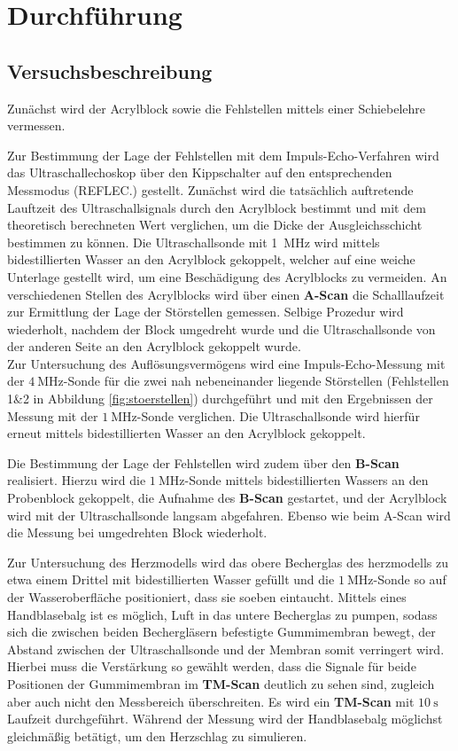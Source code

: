 \section{Durchführung}
\label{sec:Durchführung}



\subsection{Versuchsbeschreibung}
\label{sec:Versuchsbeschreibung}
Zunächst wird der Acrylblock sowie die Fehlstellen mittels einer Schiebelehre vermessen.

Zur Bestimmung der Lage der Fehlstellen mit dem Impuls-Echo-Verfahren wird das Ultraschallechoskop über den Kippschalter auf den entsprechenden Messmodus (REFLEC.) gestellt.
Zunächst wird die tatsächlich auftretende Lauftzeit des Ultraschallsignals durch den Acrylblock bestimmt und mit dem theoretisch berechneten Wert verglichen, um die Dicke der Ausgleichsschicht bestimmen zu können.
Die Ultraschallsonde mit \SI{1}{\mega\Hz} wird mittels bidestillierten Wasser an den Acrylblock gekoppelt, welcher auf eine weiche Unterlage gestellt wird, um eine Beschädigung des Acrylblocks zu vermeiden.
An verschiedenen Stellen des Acrylblocks wird über einen \textbf{A-Scan} die Schalllaufzeit zur Ermittlung der Lage der Störstellen gemessen. Selbige Prozedur wird wiederholt, nachdem der Block umgedreht wurde und die Ultraschallsonde von der anderen Seite an den Acrylblock gekoppelt wurde.
\\Zur Untersuchung des Auflösungsvermögens wird eine Impuls-Echo-Messung mit der $\SI{4}{\mega\Hz}$-Sonde für die zwei nah nebeneinander liegende Störstellen (Fehlstellen 1\&2 in Abbildung \ref{fig:stoerstellen}) durchgeführt und mit den Ergebnissen der Messung mit der $\SI{1}{\mega\Hz}$-Sonde verglichen.
Die Ultraschallsonde wird hierfür erneut mittels bidestillierten Wasser an den Acrylblock gekoppelt.

Die Bestimmung der Lage der Fehlstellen wird zudem über den \textbf{B-Scan} realisiert. Hierzu wird die $\SI{1}{\mega\Hz}$-Sonde mittels bidestillierten Wassers an den Probenblock gekoppelt, die Aufnahme des \textbf{B-Scan} gestartet, und der Acrylblock wird mit der Ultraschallsonde langsam abgefahren.
Ebenso wie beim A-Scan wird die Messung bei umgedrehten Block wiederholt.

Zur Untersuchung des Herzmodells wird das obere Becherglas des herzmodells zu etwa einem Drittel mit bidestillierten Wasser gefüllt und die $\SI{1}{\mega\Hz}$-Sonde so auf der Wasseroberfläche positioniert, dass sie soeben eintaucht. Mittels eines Handblasebalg ist es möglich, Luft in das untere Becherglas zu pumpen, sodass sich die zwischen beiden Bechergläsern befestigte Gummimembran bewegt, der Abstand zwischen der Ultraschallsonde und der Membran somit verringert wird. Hierbei muss die Verstärkung so gewählt werden, dass die Signale  für beide Positionen der Gummimembran im \textbf{TM-Scan} deutlich zu sehen sind, zugleich aber auch nicht den Messbereich überschreiten.
Es wird ein \textbf{TM-Scan} mit $\SI{10}{\second}$ Laufzeit durchgeführt. Während der Messung wird der Handblasebalg möglichst gleichmäßig betätigt, um den Herzschlag zu simulieren.
